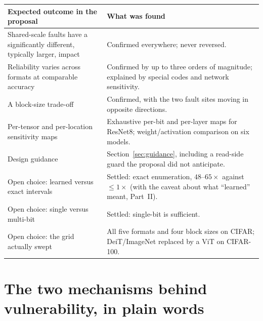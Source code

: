 \begin{center}
\small
\begin{longtable}{@{}p{5.2cm}p{10.1cm}@{}}
\toprule
\textbf{Expected outcome in the proposal} & \textbf{What was found} \\
\midrule
\endhead
Shared-scale faults have a significantly different, typically larger, impact & Confirmed everywhere; never reversed. \\
Reliability varies across formats at comparable accuracy & Confirmed by up to three orders of magnitude; explained by special codes and network sensitivity. \\
A block-size trade-off & Confirmed, with the two fault sites moving in opposite directions. \\
Per-tensor and per-location sensitivity maps & Exhaustive per-bit and per-layer maps for ResNet8; weight/activation comparison on six models. \\
Design guidance & Section~\ref{sec:guidance}, including a read-side guard the proposal did not anticipate. \\
Open choice: learned versus exact intervals & Settled: exact enumeration, $48$--$65\times$ against $\le1\times$ (with the caveat about what ``learned'' meant, Part~II). \\
Open choice: single versus multi-bit & Settled: single-bit is sufficient. \\
Open choice: the grid actually swept & All five formats and four block sizes on CIFAR; DeiT/ImageNet replaced by a ViT on CIFAR-100. \\
\bottomrule
\end{longtable}
\end{center}

\section{The two mechanisms behind vulnerability, in plain words}

